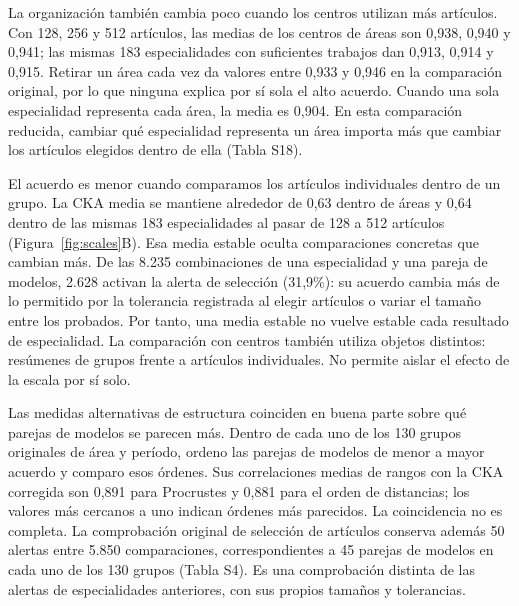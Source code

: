 \documentclass[12pt]{article}
\begin{document}
La organización también cambia poco cuando los centros utilizan más artículos. Con 128, 256 y 512 artículos, las medias de los centros de áreas son 0,938, 0,940 y 0,941; las mismas 183 especialidades con suficientes trabajos dan 0,913, 0,914 y 0,915. Retirar un área cada vez da valores entre 0,933 y 0,946 en la comparación original, por lo que ninguna explica por sí sola el alto acuerdo. Cuando una sola especialidad representa cada área, la media es 0,904. En esta comparación reducida, cambiar qué especialidad representa un área importa más que cambiar los artículos elegidos dentro de ella (Tabla S18).

El acuerdo es menor cuando comparamos los artículos individuales dentro de un grupo. La CKA media se mantiene alrededor de 0,63 dentro de áreas y 0,64 dentro de las mismas 183 especialidades al pasar de 128 a 512 artículos (Figura~\ref{fig:scales}B). Esa media estable oculta comparaciones concretas que cambian más. De las 8.235 combinaciones de una especialidad y una pareja de modelos, 2.628 activan la alerta de selección (31,9\%): su acuerdo cambia más de lo permitido por la tolerancia registrada al elegir artículos o variar el tamaño entre los probados. Por tanto, una media estable no vuelve estable cada resultado de especialidad. La comparación con centros también utiliza objetos distintos: resúmenes de grupos frente a artículos individuales. No permite aislar el efecto de la escala por sí solo.

Las medidas alternativas de estructura coinciden en buena parte sobre qué parejas de modelos se parecen más. Dentro de cada uno de los 130 grupos originales de área y período, ordeno las parejas de modelos de menor a mayor acuerdo y comparo esos órdenes. Sus correlaciones medias de rangos con la CKA corregida son 0,891 para Procrustes y 0,881 para el orden de distancias; los valores más cercanos a uno indican órdenes más parecidos. La coincidencia no es completa. La comprobación original de selección de artículos conserva además 50 alertas entre 5.850 comparaciones, correspondientes a 45 parejas de modelos en cada uno de los 130 grupos (Tabla S4). Es una comprobación distinta de las alertas de especialidades anteriores, con sus propios tamaños y tolerancias.
\end{document}
